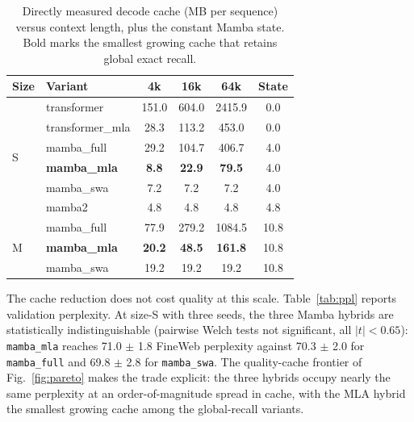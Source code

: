 \documentclass[conference]{IEEEtran}
\begin{document}
\begin{table}[t]
\centering
\caption{Directly measured decode cache (MB per sequence) versus context length, plus the constant Mamba state. Bold marks the smallest growing cache that retains global exact recall.}
\label{tab:cache}
\begin{tabular}{llcccc}
\toprule
Size & Variant & 4k & 16k & 64k & State \\
\midrule
\multirow{6}{*}{S}
 & transformer      & 151.0 & 604.0 & 2415.9 & 0.0 \\
 & transformer\_mla & 28.3  & 113.2 & 453.0  & 0.0 \\
 & mamba\_full      & 29.2  & 104.7 & 406.7  & 4.0 \\
 & \textbf{mamba\_mla} & \textbf{8.8} & \textbf{22.9} & \textbf{79.5} & 4.0 \\
 & mamba\_swa       & 7.2   & 7.2   & 7.2    & 4.0 \\
 & mamba2           & 4.8   & 4.8   & 4.8    & 4.8 \\
\midrule
\multirow{3}{*}{M}
 & mamba\_full      & 77.9  & 279.2 & 1084.5 & 10.8 \\
 & \textbf{mamba\_mla} & \textbf{20.2} & \textbf{48.5} & \textbf{161.8} & 10.8 \\
 & mamba\_swa       & 19.2  & 19.2  & 19.2   & 10.8 \\
\bottomrule
\end{tabular}
\end{table}

The cache reduction does not cost quality at this scale. Table~\ref{tab:ppl} reports validation perplexity. At size-S with three seeds, the three Mamba hybrids are statistically indistinguishable (pairwise Welch tests not significant, all $|t| < 0.65$): \texttt{mamba\_mla} reaches 71.0 $\pm$ 1.8 FineWeb perplexity against 70.3 $\pm$ 2.0 for \texttt{mamba\_full} and 69.8 $\pm$ 2.8 for \texttt{mamba\_swa}. The quality-cache frontier of Fig.~\ref{fig:pareto} makes the trade explicit: the three hybrids occupy nearly the same perplexity at an order-of-magnitude spread in cache, with the MLA hybrid the smallest growing cache among the global-recall variants.
\end{document}

